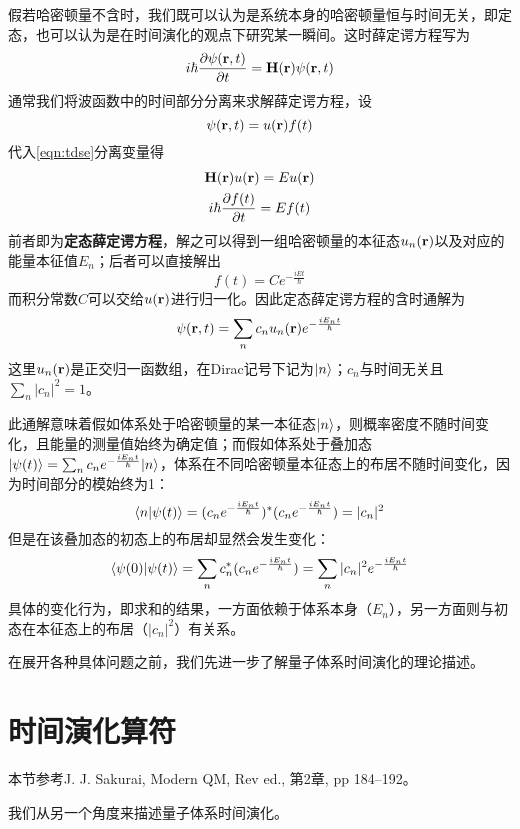 假若哈密顿量不含时，我们既可以认为是系统本身的哈密顿量恒与时间无关，即定态，也可以认为是在时间演化的观点下研究某一瞬间。这时薛定谔方程写为
\begin{equation}\label{eqn:tdse}
i\hbar \dfrac{\partial \psi(\bm{\mathrm{r}},t)}{\partial t}=\bm{\mathrm{H}}(\bm{\mathrm{r}}) \psi(\bm{\mathrm{r}},t)
\end{equation}
通常我们将波函数中的时间部分分离来求解薛定谔方程，设
\begin{equation}\label{key}
\psi(\bm{\mathrm{r}},t)=u(\bm{\mathrm{r}})f(t)
\end{equation}
代入\eqref{eqn:tdse}分离变量得
\begin{gather}
\bm{\mathrm{H}}(\bm{\mathrm{r}}) u(\bm{\mathrm{r}})=E u(\bm{\mathrm{r}})\label{eqn:TISE}\\
i\hbar \dfrac{\partial f(t)}{\partial t}=Ef(t)\label{eqn:timepart}
\end{gather}
前者即为\textbf{定态薛定谔方程}，解之可以得到一组哈密顿量的本征态$ u_n(\bm{\mathrm{r}}) $以及对应的能量本征值$ E_n $；后者可以直接解出
\begin{equation}\label{key}
f(t)=Ce^{-\frac{iEt}{\hbar}}
\end{equation}
而积分常数$ C $可以交给$ u(\bm{\mathrm{r}}) $进行归一化。因此定态薛定谔方程的含时通解为
\begin{equation}\label{key}
\psi(\bm{\mathrm{r}},t)=\sum_nc_nu_n(\bm{\mathrm{r}})e^{-\frac{iE_nt}{\hbar}}
\end{equation}
这里$ u_n(\bm{\mathrm{r}}) $是正交归一函数组，在Dirac记号下记为$ |n\rangle $；$ c_n $与时间无关且$ \sum_n |c_n|^2=1 $。

此通解意味着假如体系处于哈密顿量的某一本征态$ |n\rangle $，则概率密度不随时间变化，且能量的测量值始终为确定值；而假如体系处于叠加态$ |\psi(t)\rangle=\sum_nc_ne^{-\frac{iE_nt}{\hbar}}|n\rangle $，体系在不同哈密顿量本征态上的布居不随时间变化，因为时间部分的模始终为1：
\begin{equation}\label{key}
\langle n|\psi(t)\rangle=(c_ne^{-\frac{iE_nt}{\hbar}})^*(c_ne^{-\frac{iE_nt}{\hbar}})=|c_n|^2
\end{equation} 
但是在该叠加态的初态上的布居却显然会发生变化：
\begin{equation}\label{key}
\langle\psi(0)|\psi(t)\rangle=\sum_nc_n^*(c_ne^{-\frac{iE_nt}{\hbar}})=\sum_n|c_n|^2e^{-\frac{iE_nt}{\hbar}}
\end{equation}
具体的变化行为，即求和的结果，一方面依赖于体系本身（$ E_n $），另一方面则与初态在本征态上的布居（$ |c_n|^2 $）有关系。

在展开各种具体问题之前，我们先进一步了解量子体系时间演化的理论描述。

\section{时间演化算符}
\begin{framed}
本节参考J. J. Sakurai, Modern QM, Rev ed., 第2章, pp 184--192。
\end{framed}
我们从另一个角度来描述量子体系时间演化。

